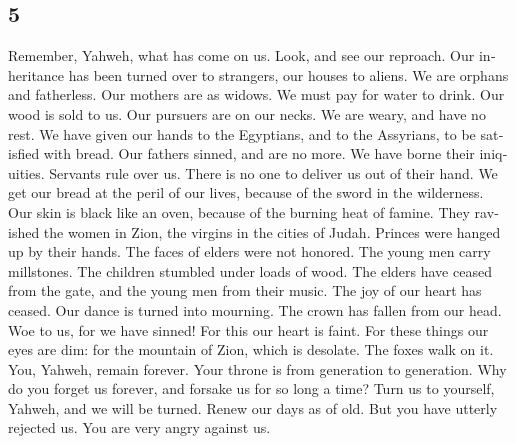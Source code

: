 \begin{paracol}{2}
\begin{otherlanguage}{english}
\hypertarget{section-9}{%
\section{5}\label{section-9}}

 Remember, Yahweh, what has come on us. Look, and see our
reproach.  Our inheritance has been turned over to
strangers, our houses to aliens.  We are orphans and
fatherless. Our mothers are as widows.  We must pay for
water to drink. Our wood is sold to us.  Our pursuers are
on our necks. We are weary, and have no rest.  We have
given our hands to the Egyptians, and to the Assyrians, to be satisfied
with bread.  Our fathers sinned, and are no more. We have
borne their iniquities.  Servants rule over us. There is
no one to deliver us out of their hand.  We get our bread
at the peril of our lives, because of the sword in the wilderness.
 Our skin is black like an oven, because of the burning
heat of famine.  They ravished the women in Zion, the
virgins in the cities of Judah.  Princes were hanged up
by their hands. The faces of elders were not honored. 
The young men carry millstones. The children stumbled under loads of
wood.  The elders have ceased from the gate, and the
young men from their music.  The joy of our heart has
ceased. Our dance is turned into mourning.  The crown has
fallen from our head. Woe to us, for we have sinned!  For
this our heart is faint. For these things our eyes are dim:
 for the mountain of Zion, which is desolate. The foxes
walk on it.  You, Yahweh, remain forever. Your throne is
from generation to generation.  Why do you forget us
forever, and forsake us for so long a time?  Turn us to
yourself, Yahweh, and we will be turned. Renew our days as of old.
 But you have utterly rejected us. You are very angry
against us. \end{otherlanguage} \end{paracol}
